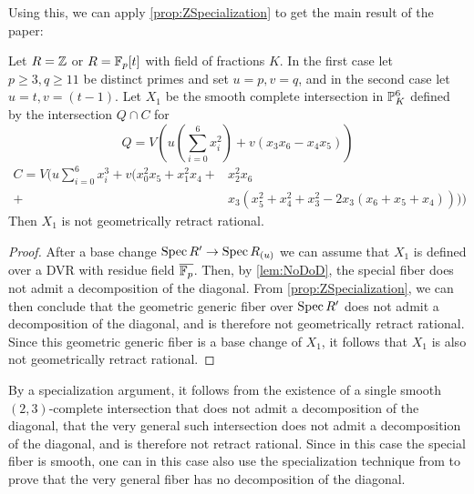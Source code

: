 Using this, we can apply \cref{prop:ZSpecialization} to get the main result of the paper:

\begin{theorem}
  Let $R=\Z$ or $R=\F_p[t]$ with field of fractions $K$. In the first case let $p \geq 3, q \geq 11$ be distinct primes and set $u=p, v=q$, and in the second case let $u=t,v=(t-1)$. Let $X_1$ be the smooth complete intersection in $\P^6_{K}$ defined by the intersection $Q \cap C$ for
\begin{equation*}
	\label{eq:Quadric3}
	Q = V\left( u \left(\sum_{i=0}^6 x_i^2 \right) + v(x_3x_6-x_4x_5)\right) 
\end{equation*}
\begin{align*}
		C = V\biggl( u \sum_{i=0}^6 x_i^3 + v(x_0^2x_5 + x_1^2x_4 + &x_2^2x_6 \\ + &x_3(x_5^2+x_4^2+x_3^2 -2x_3(x_6 + x_5 + x_4))) \biggr)
\end{align*}
Then $X_1$ is not geometrically retract rational.
\end{theorem}
\begin{proof}
	After a base change $\Spec R' \to \Spec R_{(u)}$ we can assume that $X_1$ is defined over a DVR with residue field $\overline{\F_p}$. Then, by \cref{lem:NoDoD}, the special fiber does not admit a decomposition of the diagonal. From \cref{prop:ZSpecialization}, we can then conclude that the geometric generic fiber over $\Spec R'$ does not admit a decomposition of the diagonal, and is therefore not geometrically retract rational. Since this geometric generic fiber is a base change of $X_1$, it follows that $X_1$ is also not geometrically retract rational.
\end{proof}

\begin{remark}
By a specialization argument, it follows from the existence of a single smooth $(2,3)$-complete intersection that does not admit a decomposition of the diagonal, that the very general such intersection does not admit a decomposition of the diagonal, and is therefore not retract rational. Since in this case the special fiber is smooth, one can in this case also use the specialization technique from \cite[Théorème 1.12]{ColliotThelenePirutka} to prove that the very general fiber has no decomposition of the diagonal.
\end{remark}

\printbibliography[heading = subbibliography]
\stopcontents[chapters]